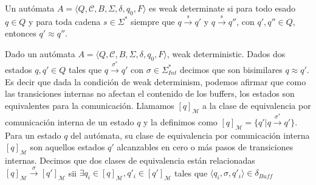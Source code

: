 \begin{definition}Un autómata $A= \langle Q, \mathcal{C}, B, \Sigma, \delta, q_0, F \rangle$ es weak determinate si para todo esado $q \in Q$ y para toda cadena $s \in \Sigma^*$ siempre que $q \xrightarrow{s} q'$ y $q \xrightarrow{s} q''$, con $q',q'' \in Q$, entonces $q' \approx q''$.

\end{definition}

\begin{definition}
Dado un autómata $A = \langle Q, \mathcal{C}, B, \Sigma, \delta, q_0, F \rangle$, weak deterministic. Dados dos estados $q, q' \in Q$ tales que $q \xrightarrow{\sigma^*} q'$ con $\sigma \in \Sigma_{\mathit{Int}}^*$ decimos que son bisimilares $q \approx q'$. Es decir que dada la condición de weak determinism, podemos afirmar que como las transiciones internas no afectan el contenido de los buffers, los estados son equivalentes para la comunicación. Llamamos $[q]_\mathcal{M}$ a la clase de equivalencia por comunicación interna de un estado $q$ y la definimos como $[q]_\mathcal{M}= \{q'| q \xrightarrow{\sigma^*} q'\}$. Para un estado $q$ del autómata, su clase de equivalencia por comunicación interna $[q]_\mathcal{M}$ son aquellos estados $q'$ alcanzables en cero o más pasos de transiciones internas. Decimos que dos clases de equivalencia están relacionadas $[q]_\mathcal{M} \xrightarrow{\sigma} [q']_\mathcal{M}$ sii $\exists q_i \in [q]_\mathcal{M}, q'_i \in [q']_\mathcal{M}$ tales que $\langle q_i,\sigma,q'_i \rangle \in \delta_{Buff}$
\end{definition}

